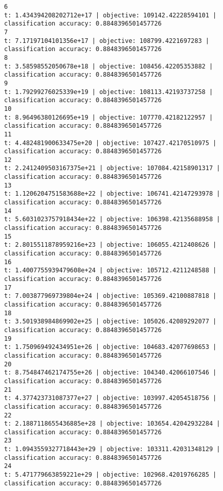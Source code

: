 \documentclass[11pt]{article}
\theoremstyle{remark}
\begin{document}
\begin{itemize}
\begin{verbatim}
6
t: 1.434394208202712e+17 | objective: 109142.42228594101 | classification accuracy: 0.8848396501457726
7
t: 7.17197104101356e+17 | objective: 108799.4221697283 | classification accuracy: 0.8848396501457726
8
t: 3.58598552050678e+18 | objective: 108456.42205353882 | classification accuracy: 0.8848396501457726
9
t: 1.79299276025339e+19 | objective: 108113.42193737258 | classification accuracy: 0.8848396501457726
10
t: 8.96496380126695e+19 | objective: 107770.42182122957 | classification accuracy: 0.8848396501457726
11
t: 4.482481900633475e+20 | objective: 107427.42170510975 | classification accuracy: 0.8848396501457726
12
t: 2.2412409503167375e+21 | objective: 107084.42158901317 | classification accuracy: 0.8848396501457726
13
t: 1.1206204751583688e+22 | objective: 106741.42147293978 | classification accuracy: 0.8848396501457726
14
t: 5.6031023757918434e+22 | objective: 106398.42135688958 | classification accuracy: 0.8848396501457726
15
t: 2.8015511878959216e+23 | objective: 106055.4212408626 | classification accuracy: 0.8848396501457726
16
t: 1.4007755939479608e+24 | objective: 105712.4211248588 | classification accuracy: 0.8848396501457726
17
t: 7.003877969739804e+24 | objective: 105369.42100887818 | classification accuracy: 0.8848396501457726
18
t: 3.501938984869902e+25 | objective: 105026.42089292077 | classification accuracy: 0.8848396501457726
19
t: 1.750969492434951e+26 | objective: 104683.42077698653 | classification accuracy: 0.8848396501457726
20
t: 8.754847462174755e+26 | objective: 104340.42066107546 | classification accuracy: 0.8848396501457726
21
t: 4.377423731087377e+27 | objective: 103997.42054518756 | classification accuracy: 0.8848396501457726
22
t: 2.1887118655436885e+28 | objective: 103654.42042932284 | classification accuracy: 0.8848396501457726
23
t: 1.0943559327718443e+29 | objective: 103311.42031348129 | classification accuracy: 0.8848396501457726
24
t: 5.471779663859221e+29 | objective: 102968.42019766285 | classification accuracy: 0.8848396501457726



\end{verbatim}
\end{itemize}
\end{document}
